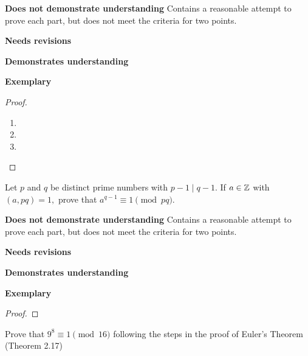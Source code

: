 \documentclass[letterpaper, 11pt]{../ximera}
\begin{document}
\begin{writeRubric}
    \item \textbf{Does not demonstrate understanding}
     Contains a reasonable attempt to prove each part, but does not meet the criteria for two points.
    \item \textbf{Needs revisions}
     
    \item \textbf{Demonstrates understanding}
    
    \item \textbf{Exemplary}
        
\end{writeRubric}
                                       \begin{proof}
 	\begin{enumerate}[label=(\alph*)]
		\item 
		\item 
		\item 
	\end{enumerate}
\end{proof}
	
\begin{ex}[Exercise 60] 
	Let $p$ and $q$ be distinct prime numbers with $p-1\mid q-1$.  If $a\in\mathbb Z$ with $(a,pq)=1,$ prove that $a^{q-1}\equiv 1 \pmod{pq}$.
\end{ex}

\begin{writeRubric}
    \item \textbf{Does not demonstrate understanding}
     Contains a reasonable attempt to prove each part, but does not meet the criteria for two points.
    \item \textbf{Needs revisions}
     
    \item \textbf{Demonstrates understanding}
    
    \item \textbf{Exemplary}
        
\end{writeRubric}
                                       \begin{proof}
\end{proof}

\begin{ex}[Exercise 67] 
	Prove that $9^8\equiv 1 \pmod{16}$ following the steps in the proof of Euler's Theorem (Theorem 2.17)
\end{ex}
\end{document}

